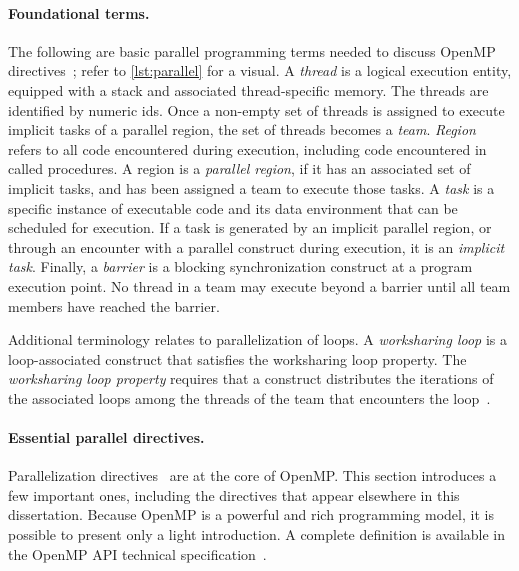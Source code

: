 \paragraph*{Foundational terms.}
The following are basic parallel programming terms needed to discuss OpenMP directives~\cite{openmp_api};
refer to \autoref{lst:parallel} for a visual.
A \emph{thread} is a logical {execution entity}, equipped with a stack and associated thread-specific memory.
The threads are identified by numeric ids.
Once a non-empty set of threads is assigned to execute implicit tasks of a parallel region, the {set of threads} becomes a \emph{team}.
\emph{Region} refers to all {code} encountered during execution, including code encountered in called procedures.
A region is a \emph{parallel region}, if it has an associated set of implicit tasks, and has been assigned a team to execute those tasks.
A \emph{task} is a specific instance of {executable code and its data environment} that can be scheduled for execution.
If a task is generated by an implicit parallel region, or through an encounter with a parallel construct during execution, it is an \emph{implicit task}.
Finally, a \emph{barrier} is a blocking synchronization construct at a program {execution point}.
No thread in a team may execute beyond a barrier until all team members have reached the barrier.

Additional terminology relates to parallelization of loops.
A \emph{worksharing loop} is a loop-associated construct that satisfies
the worksharing loop property.
The \emph{worksharing loop property} requires that a construct
distributes the iterations of the associated loops among the threads of the team that encounters the loop~\cite[p. 113]{openmp_api}.

\paragraph*{Essential parallel directives.}
{Parallelization directives}~ are at the core of OpenMP.
This section introduces a few important ones, including the directives that appear elsewhere in this dissertation.
Because OpenMP is a powerful and rich programming model, it is possible to present only a light introduction.
A complete definition is available in the OpenMP API technical specification~\cite{openmp_api}.

